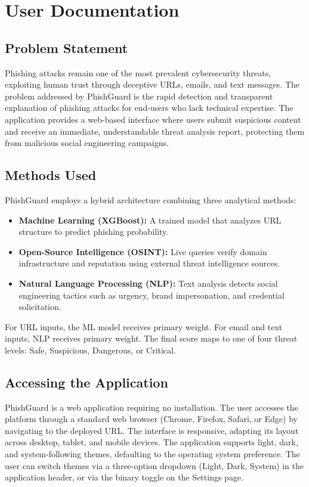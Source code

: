 \chapter{User Documentation}
\label{user-documentation}

\section{Problem Statement}

Phishing attacks remain one of the most prevalent cybersecurity threats, exploiting human trust through deceptive URLs, emails, and text messages. The problem addressed by PhishGuard is the rapid detection and transparent explanation of phishing attacks for end-users who lack technical expertise. The application provides a web-based interface where users submit suspicious content and receive an immediate, understandable threat analysis report, protecting them from malicious social engineering campaigns.

\section{Methods Used}

PhishGuard employs a hybrid architecture combining three analytical methods:

\begin{itemize}
\item \textbf{Machine Learning (XGBoost):} A trained model that analyzes URL structure to predict phishing probability.
\item \textbf{Open-Source Intelligence (OSINT):} Live queries verify domain infrastructure and reputation using external threat intelligence sources.
\item \textbf{Natural Language Processing (NLP):} Text analysis detects social engineering tactics such as urgency, brand impersonation, and credential solicitation.
\end{itemize}

For URL inputs, the ML model receives primary weight. For email and text inputs, NLP receives primary weight. The final score maps to one of four threat levels: Safe, Suspicious, Dangerous, or Critical.

\section{Accessing the Application}

PhishGuard is a web application requiring no installation. The user accesses the platform through a standard web browser (Chrome, Firefox, Safari, or Edge) by navigating to the deployed URL. The interface is responsive, adapting its layout across desktop, tablet, and mobile devices. The application supports light, dark, and system-following themes, defaulting to the operating system preference. The user can switch themes via a three-option dropdown (Light, Dark, System) in the application header, or via the binary toggle on the Settings page.

